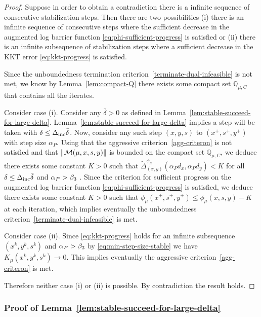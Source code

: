 \documentclass{article}
\begin{document}
\begin{proof}
Suppose in order to obtain a contradiction there is a infinite sequence of consecutive stabilization steps. Then there are two possibilities (i) there is an infinite sequence of consecutive steps where the sufficient decrease in the augmented log barrier function \eqref{eq:phi-sufficient-progress} is satisfied or (ii) there is an infinite subsequence of stabilization steps where a sufficient decrease in the KKT error \eqref{eq:kkt-progress} is satisfied.

Since the unboundedness termination criterion~\eqref{terminate-dual-infeasible} is not met, we know by Lemma~\ref{lem:compact-Q} there exists some compact set $\mathbb{Q}_{\mu,C}$ that contains all the iterates.

Consider case (i). Consider any $\bar{\delta} > 0$ as defined in Lemma~\ref{lem:stable-succeed-for-large-delta}. Lemma~\ref{lem:stable-succeed-for-large-delta} implies a step will be taken with $\delta \le \Delta_{\text{inc}} \bar{\delta}$. Now, consider any such step $(x,y,s)$ to $(x^{+}, s^{+}, y^{+})$ with step size $\alpha_{P}$. Using that the aggressive criterion~\eqref{agg-criteron} is not satisfied and that $\| \mathcal{M}(\mu, x, s, y) \|$ is bounded on the compact set $\mathbb{Q}_{\mu,C}$, we deduce there exists some constant $K > 0$ such that $\tilde{\Delta}^{\phi_{\mu}}_{(x,y)}(\alpha_{P} d_{x}, \alpha_{P} d_{y}) < K$ for all $\delta \le \Delta_{\text{inc}} \bar{\delta}$ and $\alpha_{P} > \beta_{3}$ . Since the criterion for sufficient progress on the augmented log barrier function \eqref{eq:phi-sufficient-progress} is satisfied, we deduce there exists some constant $K > 0$ such that $\phi_{\mu}(x^{+}, s^{+}, y^{+}) \le \phi_{\mu}(x, s, y) - K$ at each iteration, which implies eventually the unboundedness criterion~\eqref{terminate-dual-infeasible} is met. 

Consider case (ii). Since \eqref{eq:kkt-progress} holds for an infinite subsequence $(x^{k}, y^{k}, s^{k})$ and $\alpha_{P} > \beta_{3}$ by \eqref{eq:min-step-size-stable} we have $K_{\mu}(x^{k}, y^{k}, s^{k}) \rightarrow 0$. This implies eventually the aggressive criterion~\eqref{agg-criteron} is met.

Therefore neither case (i) or (ii) is possible. By contradiction the result holds.
\end{proof}


\subsubsection{Proof of Lemma~\ref{lem:stable-succeed-for-large-delta}}\label{sec:lem:stable-succeed-for-large-delta}
\end{document}
